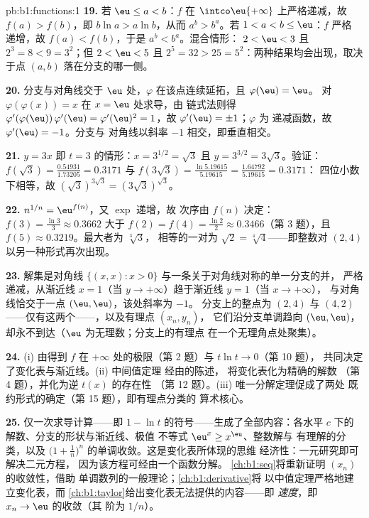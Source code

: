\begin{solution}{pb:b1:functions:1}
\textbf{19.} 若 $\eu \leq a < b$：$f$ 在
$\intco\eu{+\infty}$ 上严格递减，故 $f(a) > f(b)$，即 $b\ln a > a\ln
b$，从而 $a^b > b^a$。若 $1 < a < b \leq \eu$：$f$ 严格
递增，故 $f(a) < f(b)$，于是 $a^b < b^a$。混合情形：
$2 < \eu < 3$ 且 $2^3 = 8 < 9 = 3^2$；但 $2 < \eu < 5$ 且
$2^5 = 32 > 25 = 5^2$：两种结果均会出现，取决于点
$(a, b)$ 落在分支的哪一侧。

\textbf{20.} 分支与对角线交于 $\eu$ 处，$\varphi$
在该点连续延拓，且 $\varphi(\eu) = \eu$。
对 $\varphi(\varphi(x)) = x$ 在 $x = \eu$ 处求导，由
链式法则得 $\varphi'(\varphi(\eu))\,\varphi'(\eu) =
\varphi'(\eu)^2 = 1$，故 $\varphi'(\eu) = \pm1$；$\varphi$ 为
递减函数，故 $\varphi'(\eu) = -1$。分支与
对角线以斜率 $-1$ 相交，即垂直相交。

\textbf{21.} $y = 3x$ 即 $t = 3$ 的情形：$x = 3^{1/2} = \sqrt3$
且 $y = 3^{3/2} = 3\sqrt3$。验证：$f(\sqrt3) =
\frac{0.54931}{1.73205} = 0.3171$ 与 $f(3\sqrt3) =
\frac{\ln 5.19615}{5.19615} = \frac{1.64792}{5.19615} = 0.3171$：
四位小数下相等，故 $(\sqrt3)^{3\sqrt3} =
(3\sqrt3)^{\sqrt3}$。

\textbf{22.} $n^{1/n} = \eu^{f(n)}$，又 $\exp$ 递增，故
次序由 $f(n)$ 决定：$f(3) = \frac{\ln3}3 \approx
0.3662$ 大于 $f(2) = f(4) = \frac{\ln2}2 \approx 0.3466$（第
3 题），且 $f(5) \approx 0.3219$。最大者为 $\sqrt[3]3$，
相等的一对为 $\sqrt2 = \sqrt[4]4$——即整数对 $(2, 4)$
以另一种形式再次出现。

\textbf{23.} 解集是对角线 $\{(x,
x) : x > 0\}$ 与一条关于对角线对称的单一分支的并，
严格递减，从渐近线 $x = 1$（当 $y \to
+\infty$）趋于渐近线 $y = 1$（当 $x \to +\infty$），
与对角线恰交于一点 $(\eu, \eu)$，该处斜率为 $-1$。
分支上的整点为 $(2, 4)$ 与 $(4, 2)$
——仅有这两个——，以及有理点 $(x_n, y_n)$，
它们沿分支单调趋向 $(\eu, \eu)$，
却永不到达（$\eu$ 为无理数；分支上的有理点
在一个无理角点处聚集）。

\textbf{24.} (i) 由得到 $f$ 在
$+\infty$ 处的极限（第 2 题）与 $t\ln t \to 0$（第 10 题），
共同决定了变化表与渐近线。(ii) 中间值定理
经由的陈述，
将变化表化为精确的解数
（第 4 题），并化为逆 $t(x)$ 的存在性
（第 12 题）。(iii) 唯一分解定理促成了两处
既约形式的确定（第 15 题），即有理点分类的
算术核心。

\textbf{25.} 仅一次求导计算——即 $1 - \ln
t$ 的符号——生成了全部内容：各水平
$c$ 下的解数、分支的形状与渐近线、极值
不等式 $\eu^x \geq x^\eu$、整数解与
有理解的分类，以及 $\bigl(1 +
\frac1n\bigr)^n$ 的单调收敛。这是变化表所体现的思维
经济性：一元研究即可解决二元方程，
因为该方程可经由一个函数分解。
\cref{ch:b1:seq}将重新证明 $(x_n)$ 的收敛性，借助
单调数列的一般理论；\cref{ch:b1:derivative}将
以中值定理严格地建立变化表，而
\cref{ch:b1:taylor}给出变化表无法提供的内容——即
\emph{速度}，即 $x_n \to \eu$ 的收敛（其
阶为 $1/n$）。
\end{solution}
